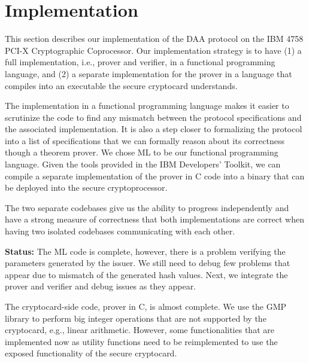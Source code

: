 \section{Implementation}
\label{sec:impl}

\begin{comment}
	\emph{EE:}
	We've two implementations.
	(implementation strategy) having two codebases using two different languages: - confidence that each implementation was correct - ability to work concurrently and with individual time constraints.
	cons: increased debuging time: Debug both in isolation, then debug their communication.
	We overshot (debugging in isolation is our current status). took much time to debug what was going wrong and we ended up with two buggy codebases. (The ML code is complete. The C code is incomplete. Both have bugs in isolation. We've yet to reach integration bugs.)
	
	!!!Things are broken!!!
\end{comment}
\fi

This section describes our implementation of the DAA protocol on the IBM 4758
PCI-X Cryptographic Coprocessor. Our implementation strategy is to have (1) a
full implementation, i.e., prover and verifier, in a functional programming
language, and (2) a separate implementation for the prover in a language that
compiles into an executable the secure cryptocard understands.

The implementation in a functional programming language makes it easier to
scrutinize the code to find any mismatch between the protocol specifications and
the associated implementation. It is also a step closer to formalizing the
protocol into a list of specifications that we can formally reason about its
correctness though a theorem prover. We chose ML to be our functional
programming language. Given the tools provided in the IBM Developers' Toolkit,
we can compile a separate implementation of the prover in C code into a binary
that can be deployed into the secure cryptoprocessor.

The two separate codebases give us the ability to progress independently and
have a strong measure of correctness that both implementations are correct when
having two isolated codebases communicating with each other.

{\bf Status:}
The ML code is complete, however, there is a problem verifying the parameters
generated by the issuer. We still need to debug few problems that appear due to
mismatch of the generated hash values. Next, we integrate the prover and
verifier and debug issues as they appear.

The cryptocard-side code, prover in C, is almost complete. We use the GMP
library to perform big integer operations that are not supported by the
cryptocard, e.g., linear arithmetic. However, some functionalities that are
implemented now as utility functions need to be reimplemented to use the exposed
functionality of the secure cryptocard.